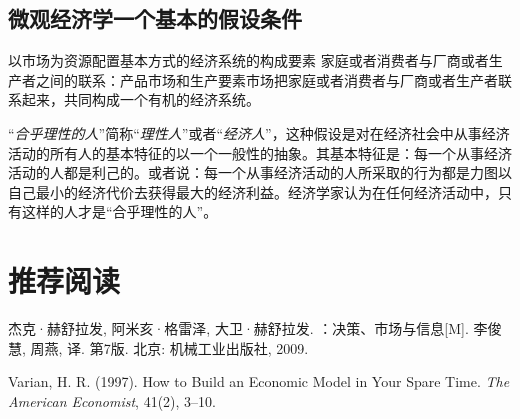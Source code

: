 \subsection{微观经济学一个基本的假设条件}
以市场为资源配置基本方式的经济系统的构成要素
家庭或者消费者与厂商或者生产者之间的联系：产品市场和生产要素市场把家庭或者消费者与厂商或者生产者联系起来，共同构成一个有机的经济系统。
\begin{Definition}[理性人]\label{dfn:rationalman}
“\emph{合乎理性的人}”简称“\emph{理性人}”或者“\emph{经济人}”，这种假设是对在经济社会中从事经济活动的所有人的基本特征的以一个一般性的抽象。其基本特征是：每一个从事经济活动的人都是利己的。或者说：每一个从事经济活动的人所采取的行为都是力图以自己最小的经济代价去获得最大的经济利益。经济学家认为在任何经济活动中，只有这样的人才是“合乎理性的人”。
\end{Definition}

\section*{推荐阅读}


\begin{asparaenum}
\item 杰克·赫舒拉发, 阿米亥·格雷泽, 大卫·赫舒拉发. {：决策、市场与信息}[M]. 李俊慧, 周燕, 译. 第7版. 北京: 机械工业出版社, 2009.%
\item Varian, H. R. (1997). How to Build an Economic Model in Your Spare Time. {\itshape The American Economist}, 41(2), 3--10.%
\end{asparaenum}